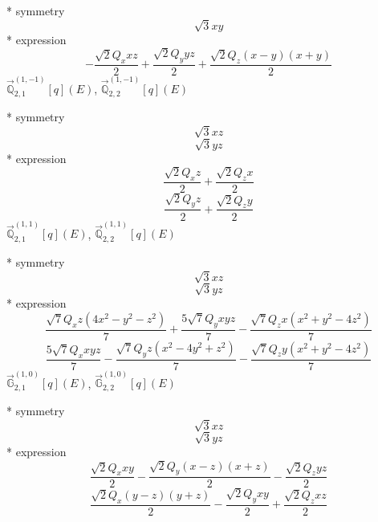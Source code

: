 \documentclass[fleqn,8pt]{jsarticle}
\begin{document}
\noindent\quad ** symmetry
\begin{dmath*}
\sqrt{3} x y
\end{dmath*}
\noindent\quad ** expression
\begin{dmath*}
- \frac{\sqrt{2} Q_{x} x z}{2} + \frac{\sqrt{2} Q_{y} y z}{2} + \frac{\sqrt{2} Q_{z} \left(x - y\right) \left(x + y\right)}{2}
\end{dmath*}
\noindent\quad $\vec{\mathbb{Q}}_{2,1}^{(1,-1)}[q](E)$, $\vec{\mathbb{Q}}_{2,2}^{(1,-1)}[q](E)$

\noindent\quad ** symmetry
\begin{dmath*}
\sqrt{3} x z
\end{dmath*}
\begin{dmath*}
\sqrt{3} y z
\end{dmath*}
\noindent\quad ** expression
\begin{dmath*}
\frac{\sqrt{2} Q_{x} z}{2} + \frac{\sqrt{2} Q_{z} x}{2}
\end{dmath*}
\begin{dmath*}
\frac{\sqrt{2} Q_{y} z}{2} + \frac{\sqrt{2} Q_{z} y}{2}
\end{dmath*}
\noindent\quad $\vec{\mathbb{Q}}_{2,1}^{(1,1)}[q](E)$, $\vec{\mathbb{Q}}_{2,2}^{(1,1)}[q](E)$

\noindent\quad ** symmetry
\begin{dmath*}
\sqrt{3} x z
\end{dmath*}
\begin{dmath*}
\sqrt{3} y z
\end{dmath*}
\noindent\quad ** expression
\begin{dmath*}
\frac{\sqrt{7} Q_{x} z \left(4 x^{2} - y^{2} - z^{2}\right)}{7} + \frac{5 \sqrt{7} Q_{y} x y z}{7} - \frac{\sqrt{7} Q_{z} x \left(x^{2} + y^{2} - 4 z^{2}\right)}{7}
\end{dmath*}
\begin{dmath*}
\frac{5 \sqrt{7} Q_{x} x y z}{7} - \frac{\sqrt{7} Q_{y} z \left(x^{2} - 4 y^{2} + z^{2}\right)}{7} - \frac{\sqrt{7} Q_{z} y \left(x^{2} + y^{2} - 4 z^{2}\right)}{7}
\end{dmath*}
\noindent\quad $\vec{\mathbb{G}}_{2,1}^{(1,0)}[q](E)$, $\vec{\mathbb{G}}_{2,2}^{(1,0)}[q](E)$

\noindent\quad ** symmetry
\begin{dmath*}
\sqrt{3} x z
\end{dmath*}
\begin{dmath*}
\sqrt{3} y z
\end{dmath*}
\noindent\quad ** expression
\begin{dmath*}
\frac{\sqrt{2} Q_{x} x y}{2} - \frac{\sqrt{2} Q_{y} \left(x - z\right) \left(x + z\right)}{2} - \frac{\sqrt{2} Q_{z} y z}{2}
\end{dmath*}
\begin{dmath*}
\frac{\sqrt{2} Q_{x} \left(y - z\right) \left(y + z\right)}{2} - \frac{\sqrt{2} Q_{y} x y}{2} + \frac{\sqrt{2} Q_{z} x z}{2}
\end{dmath*}
\end{document}
